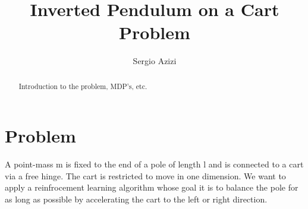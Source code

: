 \documentclass[final,3p,times,twocolumn]{elsarticle}
\begin{document}
\begin{frontmatter}

\title{Inverted Pendulum on a Cart Problem}

\author{Sergio Azizi}

\begin{abstract}
Introduction to the problem, MDP's, etc.
\end{abstract}

\end{frontmatter}

\section{Problem}
A point-mass m is fixed to the end of a pole of length l and is connected to a cart via a free hinge. The cart is restricted to move in one dimension.
We want to apply a reinfrocement learning algorithm whose goal it is to balance the pole for as long as possible by accelerating the cart to the left or right direction.
\end{document}
